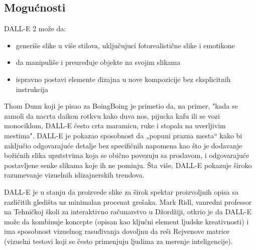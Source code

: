 \documentclass[a4paper]{article}
\begin{document}
\subsection{Mogućnosti}
\label{subsec:mogućnosti}

DALL-E 2 može da:
\begin{itemize}
\item generiše slike u više stilova, uključujucí fotorealistične slike i emotikone
\item da manipuliše i preuređuje objekte na svojim slikama
\item ispravno postavi elemente dizajna u nove kompozicije bez eksplicitnih instrukcija
\end{itemize}

Thom Dunn koji je pisao za BoingBoing je primetio da, na primer, "kada se zamoli da nacrta daikon rotkvu kako duva nos, pijucka kafu ili se vozi monociklom, DALL-E često crta maramicu, ruke i stopala na uverljivim mestima". DALL-E je pokazao sposobnost da „popuni prazna mesta“ kako bi zaključio odgovarajuće detalje bez specifičnih napomena kao što je dodavanje božićnih slika uputstvima koja se obično povezuju sa proslavom, i odgovarajuće postavljene senke slikama koje ih ne pominju. Šta više, DALL-E pokazuje široko razumevanje vizuelnih idizajnerskih trendova\cite{3}.

DALL-E je u stanju da proizvede slike za širok spektar proizvoljnih opisa sa različitih gledišta uz minimalan procenat grešaka. Mark Ridl, vanredni professor na Tehničkoj školi za interaktivno računarstvo u Džordžiji, otkrio je da DALL-E može da kombinuje koncepte (opisan kao ključni element ljudske kreativnosti) i ima sposobnost vizuelnog rasuđivanja dovoljnu da reši Rejvenove matrice (vizuelni testovi koji se često primenjuju ljudima za merenje inteligencije).
\end{document}
